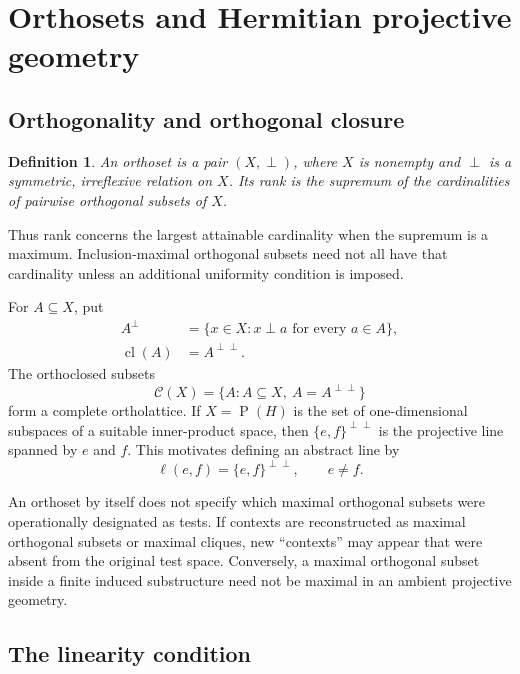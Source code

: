 \documentclass[
  aps,
  pra,
  twocolumn,
  amsmath,
  amssymb,
  longbibliography,
  nofootinbib,
  floatfix
]{revtex4-2}
\newtheorem{definition}{Definition}
\newcommand{\cC}{\mathcal C}
\newcommand{\Proj}{\operatorname{P}}
\begin{document}
\section{Orthosets and Hermitian projective geometry}
\label{sec:orthosets}

\subsection{Orthogonality and orthogonal closure}

\begin{definition}
An \emph{orthoset} is a pair $(X,\perp)$, where $X$ is nonempty and $\perp$ is
a symmetric, irreflexive relation on $X$.  Its \emph{rank} is the supremum of
the cardinalities of pairwise orthogonal subsets of $X$.
\end{definition}

Thus rank concerns the largest attainable cardinality when the supremum is a
maximum.  Inclusion-maximal orthogonal subsets need not all have that
cardinality unless an additional uniformity condition is imposed.

For $A\subseteq X$, put
\begin{align}
  A^\perp&=\{x\in X:x\perp a\text{ for every }a\in A\},\nonumber\\
  \operatorname{cl}(A)&=A^{\perp\perp}.
  \label{eq:orthoclosure}
\end{align}
The orthoclosed subsets
\begin{equation}
  \cC(X)=\{A:A\subseteq X,\ A=A^{\perp\perp}\}
  \label{eq:ortholattice}
\end{equation}
form a complete ortholattice.  If $X=\Proj(H)$ is the set of one-dimensional
subspaces of a suitable inner-product space, then
$\{e,f\}^{\perp\perp}$ is the projective line spanned by $e$ and $f$.  This
motivates defining an abstract line by
\begin{equation}
  \ell(e,f)=\{e,f\}^{\perp\perp},\qquad e\ne f.
  \label{eq:line}
\end{equation}

An orthoset by itself does not specify which maximal orthogonal subsets were
operationally designated as tests.  If contexts are reconstructed as maximal
orthogonal subsets or maximal cliques, new ``contexts'' may appear that were
absent from the original test space.  Conversely, a maximal orthogonal subset
inside a finite induced substructure need not be maximal in an ambient
projective geometry.

\subsection{The linearity condition}
\end{document}
